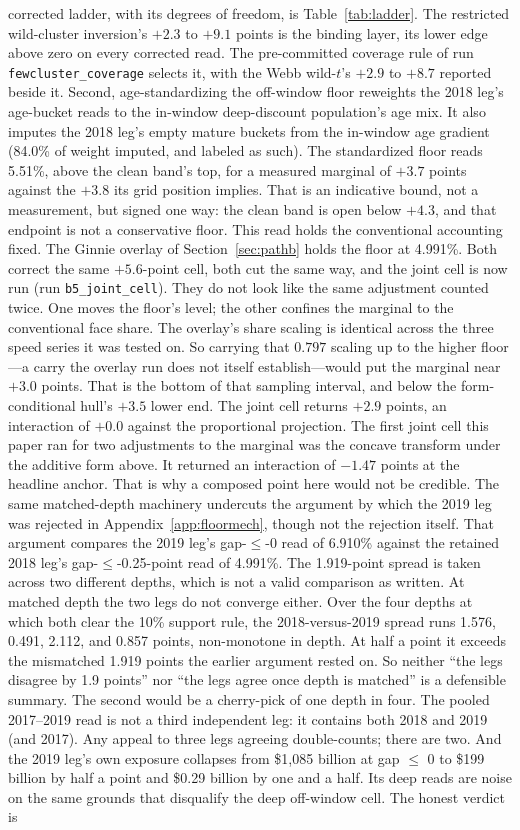 \documentclass[12pt]{article}
\begin{document}
corrected ladder, with its degrees of freedom, is Table~\ref{tab:ladder}. The restricted wild-cluster inversion's $+2.3$ to $+9.1$ points is the binding layer, its lower edge above zero on every corrected read. The pre-committed coverage rule of run \texttt{fewcluster\_coverage} selects it, with the Webb wild-$t$'s $+2.9$ to $+8.7$ reported beside it. Second, age-standardizing the off-window floor reweights the 2018 leg's age-bucket reads to the in-window deep-discount population's age mix. It also imputes the 2018 leg's empty mature buckets from the in-window age gradient (84.0\% of weight imputed, and labeled as such). The standardized floor reads 5.51\%, above the clean band's top, for a measured marginal of $+3.7$ points against the $+3.8$ its grid position implies. That is an indicative bound, not a measurement, but signed one way: the clean band is open below $+4.3$, and that endpoint is not a conservative floor. This read holds the conventional accounting fixed. The Ginnie overlay of Section~\ref{sec:pathb} holds the floor at 4.991\%. Both correct the same $+5.6$-point cell, both cut the same way, and the joint cell is now run (run \texttt{b5\_joint\_cell}). They do not look like the same adjustment counted twice. One moves the floor's level; the other confines the marginal to the conventional face share. The overlay's share scaling is identical across the three speed series it was tested on. So carrying that $0.797$ scaling up to the higher floor---a carry the overlay run does not itself establish---would put the marginal near $+3.0$ points. That is the bottom of that sampling interval, and below the form-conditional hull's $+3.5$ lower end. The joint cell returns $+2.9$ points, an interaction of $+0.0$ against the proportional projection. The first joint cell this paper ran for two adjustments to the marginal was the concave transform under the additive form above. It returned an interaction of $-1.47$ points at the headline anchor. That is why a composed point here would not be credible. The same matched-depth machinery undercuts the argument by which the 2019 leg was rejected in Appendix~\ref{app:floormech}, though not the rejection itself. That argument compares the 2019 leg's gap-$\leq$-0 read of 6.910\% against the retained 2018 leg's gap-$\leq$-0.25-point read of 4.991\%. The 1.919-point spread is taken across two different depths, which is not a valid comparison as written. At matched depth the two legs do not converge either. Over the four depths at which both clear the 10\% support rule, the 2018-versus-2019 spread runs 1.576, 0.491, 2.112, and 0.857 points, non-monotone in depth. At half a point it exceeds the mismatched 1.919 points the earlier argument rested on. So neither ``the legs disagree by 1.9 points'' nor ``the legs agree once depth is matched'' is a defensible summary. The second would be a cherry-pick of one depth in four. The pooled 2017--2019 read is not a third independent leg: it contains both 2018 and 2019 (and 2017). Any appeal to three legs agreeing double-counts; there are two. And the 2019 leg's own exposure collapses from \$1{,}085 billion at gap $\leq$ 0 to \$199 billion by half a point and \$0.29 billion by one and a half. Its deep reads are noise on the same grounds that disqualify the deep off-window cell. The honest verdict is 
\end{document}
